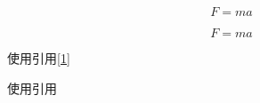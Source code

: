 \documentclass{ctexart}
\begin{document}
\begin{equation}\label{1}
    F=ma
\end{equation}

\begin{equation}\label{2}
    F=ma
\end{equation}

使用引用\ref{1}

使用引用\pageref{2}
\end{document}
